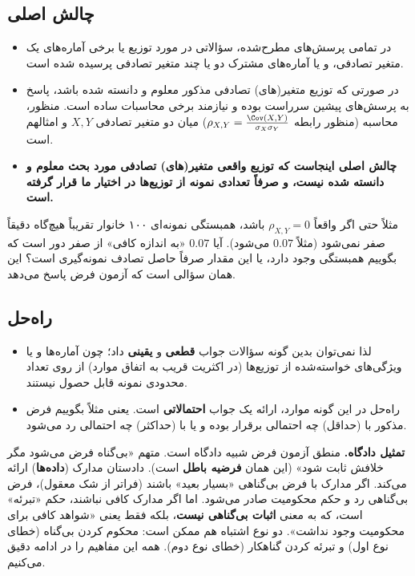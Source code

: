 \subsection{چالش اصلی}
\begin{itemize}
\item در تمامی پرسش‌های مطرح‌شده، سؤالاتی در مورد توزیع یا برخی آماره‌های یک متغیر تصادفی، و یا آماره‌های مشترک دو یا چند متغیر تصادفی پرسیده شده است.
\item در صورتی که توزیع متغیر(های) تصادفی مذکور معلوم و دانسته شده باشد، پاسخ به پرسش‌های پیشین سرراست بوده و نیازمند برخی محاسبات ساده است. منظور، محاسبه  (منظور رابطه $\rho_{X,Y}=\frac{\Cov(X,Y)}{\sigma_X\sigma_Y}$) میان دو متغیر تصادفی $X,Y$ و امثالهم است.
\item \textbf{چالش اصلی اینجاست که توزیع واقعی متغیر(های) تصادفی مورد بحث معلوم و دانسته شده نیست، و صرفاً تعدادی نمونه از توزیع‌ها در اختیار ما قرار گرفته است.}
\end{itemize}
مثلاً حتی اگر واقعاً $\rho_{X,Y}=0$ باشد، همبستگی نمونه‌ای ۱۰۰ خانوار تقریباً هیچ‌گاه دقیقاً صفر نمی‌شود (مثلاً $0.07$ می‌شود). آیا $0.07$ «به اندازه کافی» از صفر دور است که بگوییم همبستگی وجود دارد، یا این مقدار صرفاً حاصل تصادف نمونه‌گیری است؟ این همان سؤالی است که آزمون فرض پاسخ می‌دهد.

\subsection{راه‌حل}
\begin{itemize}
\item لذا نمی‌توان بدین گونه سؤالات جواب \textbf{قطعی} و \textbf{یقینی} داد؛ چون آماره‌ها و یا ویژگی‌های خواسته‌شده از توزیع‌ها (در اکثریت قریب به اتفاق موارد) از روی تعداد محدودی نمونه قابل حصول نیستند.
\item راه‌حل در این گونه موارد، ارائه یک جواب \textbf{احتمالاتی} است. یعنی مثلاً بگوییم فرض مذکور با (حداقل) چه احتمالی برقرار بوده و یا با (حداکثر) چه احتمالی رد می‌شود.
\end{itemize}

\begin{note}
\notetitle \textbf{تمثیل دادگاه.} منطق آزمون فرض شبیه دادگاه است. متهم «بی‌گناه فرض می‌شود مگر خلافش ثابت شود» (این همان \textbf{فرضیه باطل} است). دادستان مدارک (\textbf{داده‌ها}) ارائه می‌کند. اگر مدارک با فرض بی‌گناهی «بسیار بعید» باشند (فراتر از شک معقول)، فرض بی‌گناهی رد و حکم محکومیت صادر می‌شود. اما اگر مدارک کافی نباشند، حکم «تبرئه» است، که به معنی \textbf{اثبات بی‌گناهی نیست}، بلکه فقط یعنی «شواهد کافی برای محکومیت وجود نداشت». دو نوع اشتباه هم ممکن است: محکوم کردن بی‌گناه (خطای نوع اول) و تبرئه کردن گناهکار (خطای نوع دوم). همه این مفاهیم را در ادامه دقیق می‌کنیم.
\end{note}

